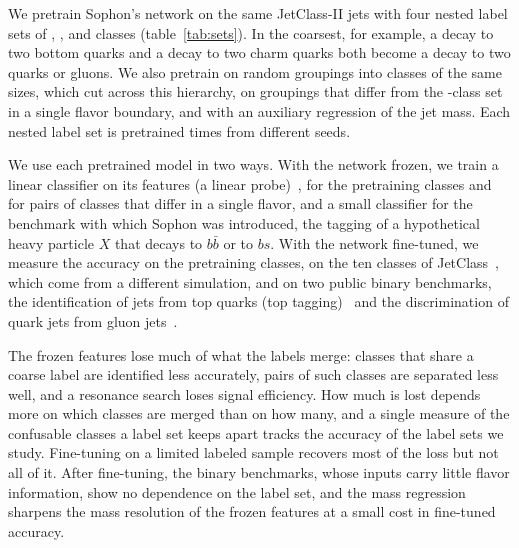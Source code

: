 We pretrain Sophon's network on the same JetClass-II jets with four nested label sets of \Kfull, \Kres, \Kmid{} and
\Kcoarse{} classes (table~\ref{tab:sets}).
In the coarsest, for example, a decay to two bottom quarks and a decay to two charm quarks both become a decay to two
quarks or gluons.
We also pretrain on random groupings into \Kcoarse{} classes of the same sizes, which cut across this hierarchy, on
groupings that differ from the \Kcoarse-class set in a single flavor boundary, and with an auxiliary regression of the
jet mass.
Each nested label set is pretrained \VRunsWord{} times from different seeds.

We use each pretrained model in two ways.
With the network frozen, we train a linear classifier on its features (a linear probe)~\cite{alain}, for the
\Kfull{} pretraining classes and for pairs of classes that differ in a single flavor, and a small classifier for the
benchmark with which Sophon was introduced, the tagging of a hypothetical heavy particle $X$ that decays to
$b\bar b$ or to $bs$.
With the network fine-tuned, we measure the accuracy on the pretraining classes, on the ten classes of
JetClass~\cite{part}, which come from a different simulation, and on two public binary benchmarks, the identification
of jets from top quarks (top tagging)~\cite{toptag} and the discrimination of quark jets from gluon
jets~\cite{efn,qgpythia,qgherwig}.

The frozen features lose much of what the labels merge: classes that share a coarse label are identified less
accurately, pairs of such classes are separated less well, and a resonance search loses signal efficiency.
How much is lost depends more on which classes are merged than on how many, and a single measure of the confusable
classes a label set keeps apart tracks the accuracy of the label sets we study.
Fine-tuning on a limited labeled sample recovers most of the loss but not all of it.
After fine-tuning, the binary benchmarks, whose inputs carry little flavor information, show no dependence on the
label set, and the mass regression sharpens the mass resolution of the frozen features at a small cost in fine-tuned accuracy.
